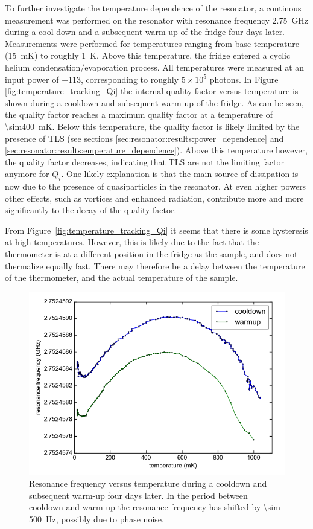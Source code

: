 To further investigate the temperature dependence of the resonator, a continous measurement was performed on the resonator with resonance frequency \SI{2.75}{\giga \hertz} during a cool-down and a subsequent warm-up of the fridge four days later. Measurements were performed for temperatures ranging from base temperature (\SI{15}{\milli \kelvin}) to roughly \SI{1}{\kelvin}. Above this temperature, the fridge entered a cyclic helium condensation/evaporation process. All temperatures were measured at an input power of \SI{-113}{\dBm}, corresponding to roughly $5 \times 10^5$ photons. In Figure \ref{fig:temperature_tracking_Qi} the internal quality factor versus temperature is shown during a cooldown and subsequent warm-up of the fridge. As can be seen, the quality factor reaches a maximum quality factor at a temperature of \SI{\sim400}{\milli \kelvin}. Below this temperature, the quality factor is likely limited by the presence of TLS (see sections \ref{sec:resonator:results:power_dependence} and \ref{sec:resonator:results:emperature_dependence}). Above this temperature however, the quality factor decreases, indicating that TLS are not the limiting factor anymore for $Q_i$. One likely explanation is that the main source of dissipation is now due to the presence of quasiparticles in the resonator. At even higher powers other effects, such as vortices and enhanced radiation, contribute more and more significantly to the decay of the quality factor.

From Figure~\ref{fig:temperature_tracking_Qi} it seems that there is some hysteresis at high temperatures. However, this is likely due to the fact that the thermometer is at a different position in the fridge as the sample, and does not thermalize equally fast. There may therefore be a delay between the temperature of the thermometer, and the actual temperature of the sample.

\begin{figure}[h!]
    \centering
    \includegraphics[width=.72\textwidth]{Figures/DRIE/Temperature tracking - f0 vs T.png}
    \caption{Resonance frequency versus temperature during a cooldown and subsequent warm-up four days later. In the period between cooldown and warm-up the resonance frequency has shifted by \SI{\sim 500}{\hertz}, possibly due to phase noise.}
    \label{fig:temperature_tracking_f0}
\end{figure}


